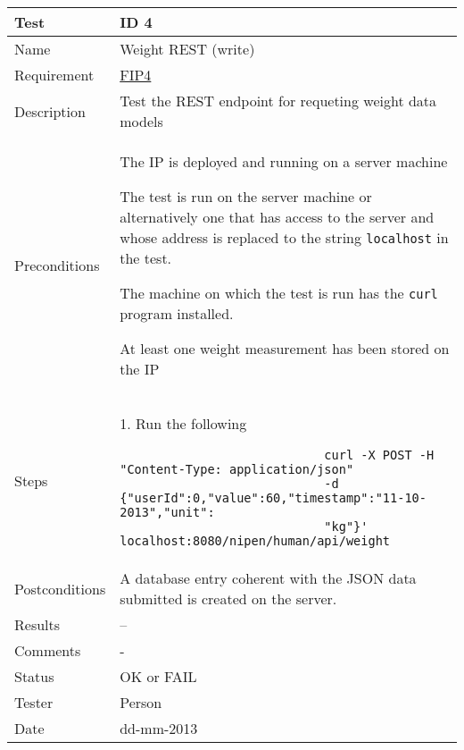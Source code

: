 \begin{table}
\begin{center}
\begin{tabular}{ | l | p{10cm} | }
	\hline
	\textbf{Test}	&	\textbf{ID 4} \\
	\hline\noalign{\smallskip}\noalign{\smallskip}\hline
	Name				& Weight REST (write) \\
	Requirement			& \hyperref[table:reqip]{FIP4} \\
	Description			& Test the REST endpoint for requeting weight data models \\
	Preconditions		&	\par The IP is deployed and running on a server machine
							\par The test is run on the server machine or alternatively
							one that has access to the server and whose address is replaced to the
							string \verb|localhost| in the test.
							\par The machine on which the test is run has the \verb|curl| program installed.
							\par At least one weight measurement has been stored on the IP \\
	Steps 				&	1. Run the following \begin{verbatim}
							curl -X POST -H "Content-Type: application/json"
							-d {"userId":0,"value":60,"timestamp":"11-10-2013","unit":
							"kg"}' localhost:8080/nipen/human/api/weight
							\end{verbatim} \\
	Postconditions		& A database entry coherent with the JSON data submitted is created on the server. \\
	Results				& -- \\
	Comments			& - \\
	Status				& OK or FAIL \\
	Tester				& Person \\
	Date				& dd-mm-2013 \\
	\hline
\end{tabular}
\end{center}
\end{table}

